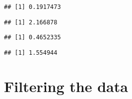 \documentclass[]{article}
\newenvironment{Shaded}{\begin{snugshade}}{\end{snugshade}}
\newcommand{\DecValTok}[1]{\textcolor[rgb]{0.00,0.00,0.81}{#1}}
\newcommand{\KeywordTok}[1]{\textcolor[rgb]{0.13,0.29,0.53}{\textbf{#1}}}
\newcommand{\NormalTok}[1]{#1}
\newcommand{\OperatorTok}[1]{\textcolor[rgb]{0.81,0.36,0.00}{\textbf{#1}}}
\begin{document}
\begin{verbatim}
## [1] 0.1917473
\end{verbatim}

\begin{Shaded}
\end{Shaded}

\begin{verbatim}
## [1] 2.166878
\end{verbatim}

\begin{Shaded}
\end{Shaded}

\begin{verbatim}
## [1] 0.4652335
\end{verbatim}

\begin{Shaded}
\end{Shaded}

\begin{verbatim}
## [1] 1.554944
\end{verbatim}

\hypertarget{filtering-the-data}{%
\section{Filtering the data}\label{filtering-the-data}}
\end{document}
